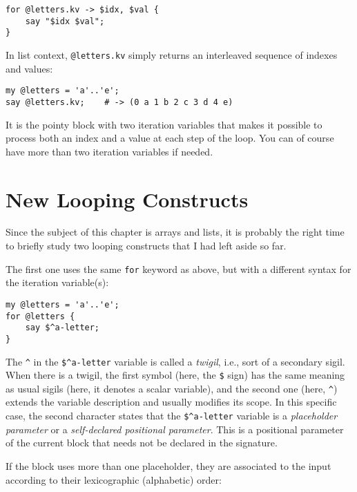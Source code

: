 \begin{verbatim}
for @letters.kv -> $idx, $val { 
    say "$idx $val";
}
\end{verbatim}

In list context, \verb'@letters.kv' simply returns an 
interleaved sequence of indexes and values:

\begin{verbatim}
my @letters = 'a'..'e';
say @letters.kv;    # -> (0 a 1 b 2 c 3 d 4 e)
\end{verbatim}

It is the pointy block with two iteration variables 
that makes it possible to process both an index and 
a value at each step of the loop. You can of course 
have more than two iteration variables if needed.


\section{New Looping Constructs}

Since the subject of this chapter is arrays and lists, 
it is probably the right time to briefly study two 
looping constructs that I had left aside so far.

The first one uses the same {\tt for} keyword as above, 
but with a different syntax for the iteration variable(s):

\begin{verbatim}
my @letters = 'a'..'e';
for @letters { 
    say $^a-letter; 
}
\end{verbatim}

The \verb'^' in the \verb'$^a-letter' variable is called 
a \emph{twigil}, i.e., sort of a secondary sigil. When there is 
a twigil, the first symbol (here, the \verb'$' sign) has the 
same meaning as usual sigils (here, it denotes a scalar variable), 
and the second one (here, \verb'^') extends the variable 
description and usually modifies its scope. In this specific 
case, the second character states that the \verb'$^a-letter' 
variable is a  \emph{placeholder parameter} or a 
\emph{self-declared positional parameter}. This is a positional 
parameter of the current block that needs not be declared in 
the signature.

If the block uses more than one placeholder, they are 
associated to the input according to their lexicographic 
(alphabetic) order:

